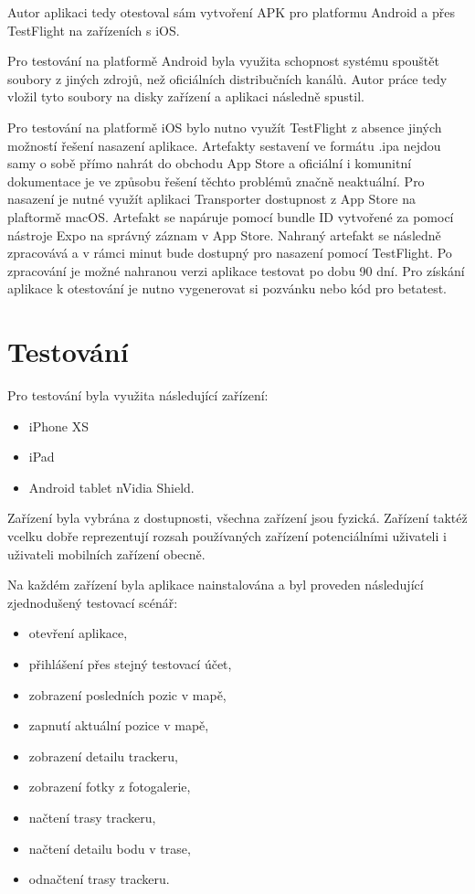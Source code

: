 Autor aplikaci tedy otestoval sám vytvoření APK pro platformu Android a přes TestFlight na zařízeních s iOS.

Pro testování na platformě Android byla využita schopnost systému spouštět soubory z jiných zdrojů, než oficiálních distribučních kanálů. Autor práce tedy vložil tyto soubory na disky zařízení a aplikaci následně spustil.

Pro testování na platformě iOS bylo nutno využít TestFlight z absence jiných možností řešení nasazení aplikace. Artefakty sestavení ve formátu .ipa nejdou samy o sobě přímo nahrát do obchodu App Store a oficiální i komunitní dokumentace je ve způsobu řešení těchto problémů značně neaktuální. Pro nasazení je nutné využít aplikaci Transporter dostupnost z App Store na plaftormě macOS. Artefakt se napáruje pomocí bundle ID vytvořené za pomocí nástroje Expo na správný záznam v App Store. Nahraný artefakt se následně zpracovává a v rámci minut bude dostupný pro nasazení pomocí TestFlight. Po zpracování je možné nahranou verzi aplikace testovat po dobu 90 dní. Pro získání aplikace k otestování je nutno vygenerovat si pozvánku nebo kód pro betatest.

\section{Testování}
Pro testování byla využita následující zařízení:
\begin{itemize}
	\item iPhone XS
	\item iPad
	\item Android tablet nVidia Shield.
\end{itemize}

Zařízení byla vybrána z dostupnosti, všechna zařízení jsou fyzická. Zařízení taktéž vcelku dobře reprezentují rozsah používaných zařízení potenciálními uživateli i uživateli mobilních zařízení obecně.

Na každém zařízení byla aplikace nainstalována a byl proveden následující zjednodušený testovací scénář:

\begin{itemize}
	\item otevření aplikace,
	\item přihlášení přes stejný testovací účet,
	\item zobrazení posledních pozic v mapě,
	\item zapnutí aktuální pozice v mapě,
	\item zobrazení detailu trackeru,
	\item zobrazení fotky z fotogalerie,
	\item načtení trasy trackeru,
	\item načtení detailu bodu v trase,
	\item odnačtení trasy trackeru.
\end{itemize}

